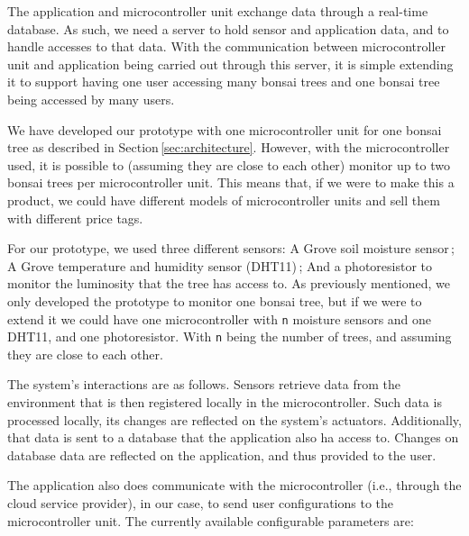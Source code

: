 \documentclass{article}
\begin{document}
The application and microcontroller unit exchange data through a real-time
database. As such, we need a server to hold sensor and application data, and to
handle accesses to that data. With the communication between microcontroller
unit and application being carried out through this server, it is simple
extending it to support having one user accessing many bonsai trees and one
bonsai tree being accessed by many users.

We have developed our prototype with one microcontroller unit for one bonsai
tree as described in Section\,\ref{sec:architecture}. However, with the
microcontroller used, it is possible to (assuming they are close to each other)
monitor up to two bonsai trees per microcontroller unit. This means that, if we
were to make this a product, we could have different models of microcontroller
units and sell them with different price tags.

For our prototype, we used three different sensors: A Grove soil moisture
sensor\,\cite{sensor_moisture}; A Grove temperature and humidity sensor
(DHT11)\,\cite{sensor_dht11}; And a photoresistor to monitor the luminosity that
the tree has access to. As previously mentioned, we only developed the prototype
to monitor one bonsai tree, but if we were to extend it we could have one
microcontroller with \texttt{n} moisture sensors and one DHT11, and one
photoresistor. With \texttt{n} being the number of trees, and assuming they are
close to each other.

The system's interactions are as follows. Sensors retrieve data from the
environment that is then registered locally in the microcontroller. Such data is
processed locally, its changes are reflected on the system's actuators.
Additionally, that data is sent to a database that the application also ha
access to. Changes on database data are reflected on the application, and thus
provided to the user.

The application also does communicate with the microcontroller (i.e., through
the cloud service provider), in our case, to send user configurations to the
microcontroller unit. The currently available configurable parameters are: 
\end{document}
